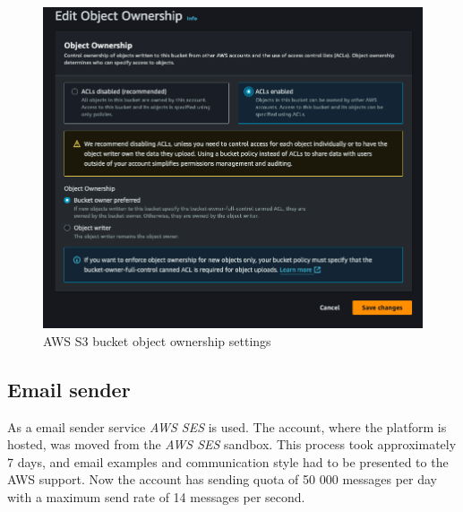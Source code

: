 \begin{figure}[p]\centering
\includegraphics[width=140mm]{img/docs/fig_aws_object_ownership.png}
\caption{AWS S3 bucket object ownership settings}
\label{img:admin-manual-aws.s3.acls}
\end{figure}


\subsection{Email sender}
As a email sender service \textit{AWS \ac{SES}} is used.
The account, where the platform is hosted, was moved from the \textit{AWS \ac{SES}} sandbox.
This process took approximately 7 days, and email examples and communication style had to be presented to the AWS support. 
Now the account has sending quota of 50 000 messages per day with a maximum send rate of 14 messages per second.